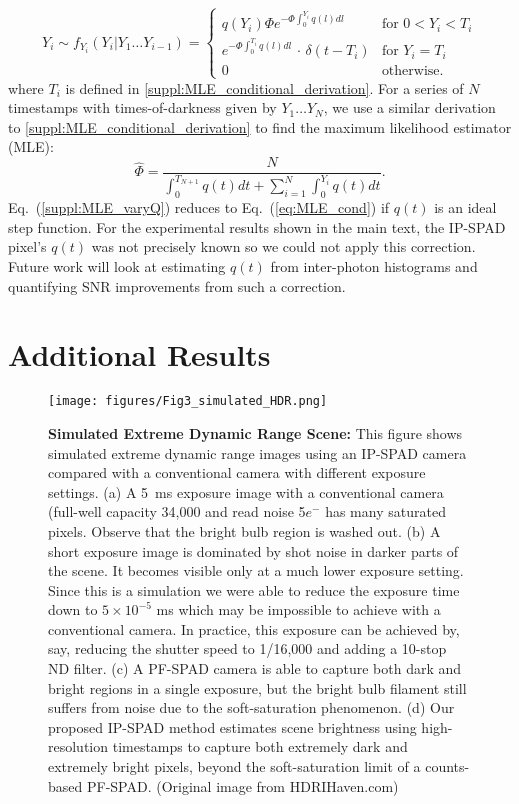 \begin{equation}
Y_{i} \sim f_{Y_{i}}(Y_i | Y_{1}\dots Y_{i-1})=\begin{cases}
q(Y_i)\Phi e^{-\Phi\int_0^{Y_i}q(l)dl} & \mbox{for } 0< Y_i< T_i\\
e^{-\Phi \int_0^{T_i}q(l)dl} \,\cdot\, \delta(t-T_i) &\mbox{for } Y_i=T_i\\
0 & \mbox{otherwise.}
\end{cases} \label{eq:interarrival_distr_varyQ}
\end{equation}
where $T_i$ is defined in \ref{suppl:MLE_conditional_derivation}. For a series
of $N$ timestamps with times-of-darkness given by $Y_1\dots Y_{N}$, we use a
similar derivation to \ref{suppl:MLE_conditional_derivation} to find the
maximum likelihood estimator (MLE): 
\begin{equation}
  \widehat \Phi =  \frac{N}{\int^{T_{N+1}}_0 q(t)dt+\sum_{i=1}^N\int^{Y_i}_0 q(t)dt}. \label{suppl:MLE_varyQ}
\end{equation}
Eq.~(\ref{suppl:MLE_varyQ}) reduces to Eq.~(\ref{eq:MLE_cond}) if $q(t)$ is an
ideal step function. For the experimental results shown in the main text, the
IP-SPAD pixel's $q(t)$ was not precisely known so we could not apply this
correction. Future work will look at estimating $q(t)$ from inter-photon
histograms and quantifying SNR improvements from such a correction.

\clearpage
\section{Additional Results\label{suppl:additional_results}}

\begin{figure}[!htb]
  \centering
  \texttt{[image: figures/Fig3\_simulated\_HDR.png]}
  \caption{\textbf{Simulated Extreme Dynamic Range Scene:}
  This figure shows simulated extreme dynamic range images using an IP-SPAD
  camera compared with a conventional camera with different exposure settings.
  (a) A \SI{5}{\ms} exposure image with a conventional camera (full-well capacity
  34,000 and read noise 5$e^-$ has many saturated pixels. Observe that the
  bright bulb region is washed out.  (b) A short exposure image is dominated by
  shot noise in darker parts of the scene.  It becomes visible only at a much
  lower exposure setting. Since this is a simulation we were able to reduce the
  exposure time down to $5 \times 10^{-5}$ \si{\ms} which may be impossible to
  achieve with a conventional camera. In practice, this exposure can be
  achieved by, say, reducing the shutter speed to 1/16,000 and adding a 10-stop
  ND filter.  (c) A PF-SPAD camera is able to capture both dark and bright
  regions in a single exposure, but the bright bulb filament still suffers from
  noise due to the soft-saturation phenomenon. (d) Our proposed IP-SPAD method
  estimates scene brightness using high-resolution timestamps to capture both
  extremely dark and extremely bright pixels, beyond the soft-saturation limit
  of a counts-based PF-SPAD.  (Original image from HDRIHaven.com) 
    \label{fig:sim_hdr_suppl}}
\end{figure}
\clearpage

